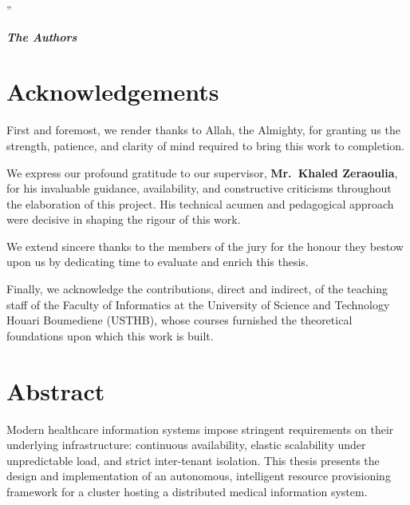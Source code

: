 \documentclass[12pt,a4paper]{report}
\begin{document}
\begin{flushright}
{\large ''}
\end{flushright}

\vfill
\noindent\textbf{\textit{The Authors}}

\chapter*{Acknowledgements}

\vspace{0.5cm}

First and foremost, we render thanks to Allah, the Almighty, for granting us the
strength, patience, and clarity of mind required to bring this work to completion.

We express our profound gratitude to our supervisor, \textbf{Mr.~Khaled Zeraoulia},
for his invaluable guidance, availability, and constructive criticisms throughout
the elaboration of this project. His technical acumen and pedagogical approach were
decisive in shaping the rigour of this work.

We extend sincere thanks to the members of the jury for the honour they bestow upon
us by dedicating time to evaluate and enrich this thesis.

Finally, we acknowledge the contributions, direct and indirect, of the teaching staff
of the Faculty of Informatics at the University of Science and Technology Houari
Boumediene (USTHB), whose courses furnished the theoretical foundations upon which
this work is built.

\chapter*{Abstract}

\vspace{0.5cm}

Modern healthcare information systems impose stringent requirements on their
underlying infrastructure: continuous availability, elastic scalability under
unpredictable load, and strict inter-tenant isolation. This thesis presents the
design and implementation of an autonomous, intelligent resource provisioning
framework for a cluster hosting a distributed medical information system.
\end{document}
